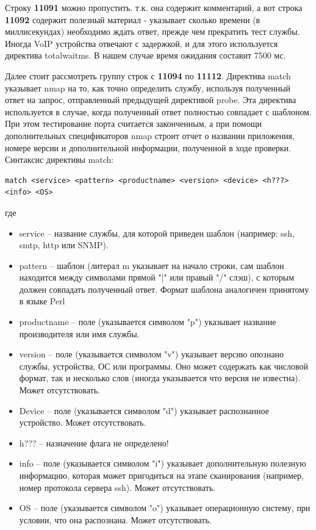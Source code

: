 \documentclass[a4paper, 12pt]{article}		%
\begin{document}
Строку \textbf{11091} можно пропустить. т.к. она содержит комментарий, а вот строка \textbf{11092} содержит полезный материал - указывает сколько времени (в миллисекундах) необходимо ждать ответ, прежде чем прекратить тест службы. Иногда VoIP устройства отвечают с задержкой, и для этого используется директива totalwaitms. В нашем случае время ожидания составит 7500 мс.

Далее стоит рассмотреть группу строк с \textbf{11094} по \textbf{11112}. Директива match указывает nmap на то, как точно определить службу, используя полученный ответ на запрос, отправленный предыдущей директивой probe. Эта директива используется в случае, когда полученный ответ полностью совпадает с шаблоном. При этом тестирование порта считается законченным, а при помощи дополнительных спецификаторов nmap строит отчет о названии приложения, номере версии и дополнительной информации, полученной в ходе проверки. Синтаксис директивы match:
\begin{Verbatim}[frame=single]
match <service> <pattern> <productname> <version> <device> <h???> <info> <OS>
\end{Verbatim}
где
\begin{itemize}
  \item service -- название службы, для которой приведен шаблон (например: ssh, smtp, http или SNMP). 
  \item pattern -- шаблон (литерал m указывает на начало строки, сам шаблон находится между символами прямой "|" или правый "/" слэш), с которым должен совпадать полученный ответ. Формат шаблона аналогичен принятому в языке Perl
  \item productname -- поле (указывается символом "p") указывает название производителя или имя службы.
  \item version -- поле (указывается символом "v") указывает версию опознано службы, устройства, ОС или программы. Оно может содержать как числовой формат, так и несколько слов (иногда указывается что версия не известна). Может отсутствовать.
  \item Device -- поле (указывается символом "d") указывает распознанное устройство. Может отсутствовать.
  \item h??? -- назначение флага не определено!
  \item info -- поле (указывается символом "i") указывает дополнительную полезную информацию, которая может пригодиться на этапе сканирования (например, номер протокола сервера ssh). Может отсутствовать.
  \item OS -- поле (указывается символом "o") указывает операционную систему, при условии, что она распознана. Может отсутствовать.
\end{itemize}
\end{document}
